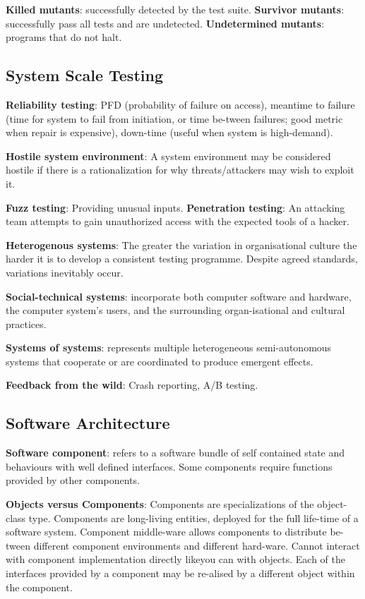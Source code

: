 \documentclass{article}
\begin{document}
\noindent \textbf{Killed mutants}: successfully detected by the test suite.
\noindent \textbf{Survivor mutants}: successfully pass all tests and are undetected.
\noindent \textbf{Undetermined mutants}: programs that do not halt.


\subsection*{System Scale Testing}

\noindent \textbf{Reliability testing}: PFD (probability of failure on access), meantime to failure (time for system to fail from initiation, 
or time be-tween failures; good metric when repair is expensive), down-time (useful when system is high-demand).

\noindent \textbf{Hostile system environment}: A system environment may be considered hostile if there is a rationalization for why threats/attackers may wish to exploit it.

\noindent \textbf{Fuzz testing}: Providing unusual inputs. 
\noindent \textbf{Penetration testing}: An attacking team attempts to gain unauthorized access with the expected tools of a hacker.

\noindent \textbf{Heterogenous systems}: The greater the variation in organisational culture the harder it is to develop a consistent testing programme. Despite agreed standards, variations inevitably occur.

\noindent \textbf{Social-technical systems}: incorporate both computer software and hardware, the computer system’s users, and the surrounding organ-isational and cultural practices.

\noindent \textbf{Systems of systems}: represents multiple heterogeneous semi-autonomous systems that cooperate or are coordinated to produce emergent effects.

\noindent \textbf{Feedback from the wild}: Crash reporting, A/B testing.


\subsection*{Software Architecture}

\noindent \textbf{Software component}: refers to a software bundle of self contained state and behaviours with well defined interfaces. Some components require functions provided by other components.

\noindent \textbf{Objects versus Components}:
Components are specializations of the object-class type.
Components are long-living entities, deployed for the full life-time of a software system.
Component middle-ware allows components to distribute be-tween different component environments and different hard-ware.
Cannot interact with component implementation directly likeyou can with objects.
Each of the interfaces provided by a component may be re-alised by a different object within the component.
\end{document}
